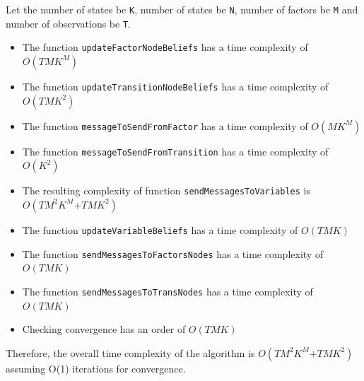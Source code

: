 \begin{center}
\end{center}

Let the number of states be \texttt{K}, number of states be \texttt{N}, number of factors be \texttt{M} and number of observations be \texttt{T}.

\begin{itemize}
    \item The function \texttt{updateFactorNodeBeliefs} has a time complexity of $O(TMK^M)$
    \item The function \texttt{updateTransitionNodeBeliefs} has a time complexity of $O(TMK^2)$
    \item The function \texttt{messageToSendFromFactor} has a time complexity of $O(MK^M)$
    \item The function \texttt{messageToSendFromTransition} has a time complexity of $O(K^2)$
    \item The resulting complexity of function \texttt{sendMessagesToVariables} is $O(TM^2K^M \texttt{+} TMK^2)$
    \item The function \texttt{updateVariableBeliefs} has a time complexity of $O(TMK)$
    \item The function \texttt{sendMessagesToFactorsNodes} has a time complexity of $O(TMK)$
    \item The function \texttt{sendMessagesToTransNodes} has a time complexity of $O(TMK)$
    \item Checking convergence has an order of $O(TMK)$
\end{itemize}
Therefore, the overall time complexity of the algorithm is $O(TM^2K^M \texttt{+} TMK^2)$ assuming O(1) iterations for convergence. 

